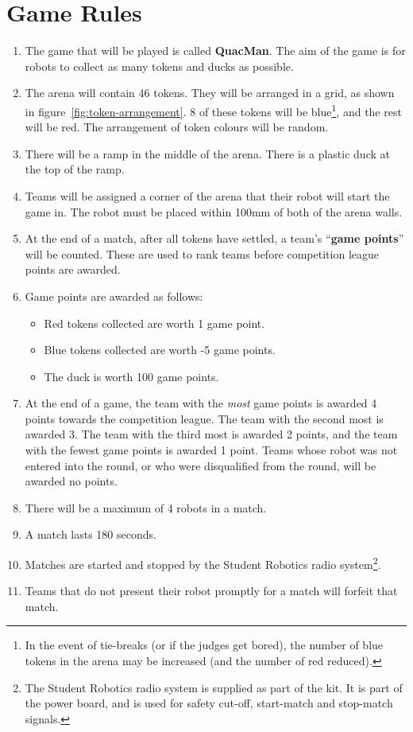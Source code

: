\section {Game Rules}
\label{game-rules}

\begin{enumerate}
\item The game that will be played is called \textbf{QuacMan}.  The aim of the game is for robots to collect as many tokens and ducks as possible.
\item The arena will contain 46 tokens.  They will be arranged in a grid, as shown in figure~\ref{fig:token-arrangement}.  8 of these tokens will be blue\footnote{In the event of tie-breaks (or if the judges get bored), the number of blue tokens in the arena may be increased (and the number of red reduced).}, and the rest will be red.  The arrangement of token colours will be random.
\item There will be a ramp in the middle of the arena.  There is a plastic duck at the top of the ramp.
\item Teams will be assigned a corner of the arena that their robot will start the game in.  The robot must be placed within 100mm of both of the arena walls.
\item At the end of a match, after all tokens have settled, a team's ``\textbf{game points}'' will be counted.
 These are used to rank teams before competition league points are awarded.

\item Game points are awarded as follows:
\begin{itemize}
\item Red tokens collected are worth 1 game point.
\item Blue tokens collected are worth -5 game points.
\item The duck is worth 100 game points.
\end{itemize}

\item At the end of a game, the team with the \emph{most} game points is awarded 4 points towards the competition league.
 The team with the second most is awarded 3.
 The team with the third most is awarded 2 points, and the team with the fewest game points is awarded 1 point.
 Teams whose robot was not entered into the round, or who were disqualified from the round, will be awarded no points.

\item There will be a maximum of 4 robots in a match.
\item A match lasts 180 seconds.
\item Matches are started and stopped by the Student Robotics radio system\footnote{The Student Robotics radio system is supplied as part of the kit.
 It is part of the power board, and is used for safety cut-off, start-match and stop-match signals.}.
\item Teams that do not present their robot promptly for a match will forfeit that match.
\end{enumerate}

